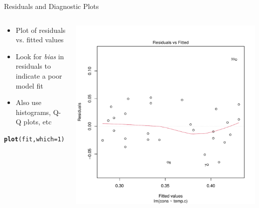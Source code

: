 \documentclass[aspectratio=169]{beamer}\usepackage[]{graphicx}\usepackage[]{color}
\makeatletter
\def\maxwidth{ %
  \ifdim\Gin@nat@width>\linewidth
    \linewidth
  \else
    \Gin@nat@width
  \fi
}
\newcommand{\hlnum}[1]{\textcolor[rgb]{0.686,0.059,0.569}{#1}}%
\newcommand{\hlstd}[1]{\textcolor[rgb]{0.345,0.345,0.345}{#1}}%
\newcommand{\hlkwc}[1]{\textcolor[rgb]{0.333,0.667,0.333}{#1}}%
\newcommand{\hlkwd}[1]{\textcolor[rgb]{0.737,0.353,0.396}{\textbf{#1}}}%
\newenvironment{kframe}{%
 \def\at@end@of@kframe{}%
 \ifinner\ifhmode%
  \def\at@end@of@kframe{\end{minipage}}%
  \begin{minipage}{\columnwidth}%
 \fi\fi%
 \def\FrameCommand##1{\hskip\@totalleftmargin \hskip-\fboxsep
 \colorbox{shadecolor}{##1}\hskip-\fboxsep
     \hskip-\linewidth \hskip-\@totalleftmargin \hskip\columnwidth}%
 \MakeFramed {\advance\hsize-\width
   \@totalleftmargin\z@ \linewidth\hsize
   \@setminipage}}%
 {\par\unskip\endMakeFramed%
 \at@end@of@kframe}
\newenvironment{knitrout}{}{} %
\makeatother
\begin{document}
\begin{frame}[fragile]{Residuals and Diagnostic Plots}
\begin{columns}
  \begin{column}{0.5\textwidth}
	\begin{itemize}
		\item Plot of residuals vs. fitted values
		\item Look for \emph{bias} in residuals to indicate a poor model fit
		\item Also use histograms, Q-Q plots, etc
	\end{itemize}
\begin{knitrout}\scriptsize
{}\color{fgcolor}\begin{kframe}
\begin{alltt}
\hlkwd{plot}\hlstd{(fit,} \hlkwc{which}\hlstd{=}\hlnum{1}\hlstd{)}
\end{alltt}
\end{kframe}
\end{knitrout}
  \end{column}
  \begin{column}{0.5\textwidth}
\begin{knitrout}\scriptsize
{}\color{fgcolor}
\includegraphics[width=\maxwidth]{figure/unnamed-chunk-13-1} 

\end{knitrout}
  \end{column}
\end{columns}
\end{frame}
\end{document}
